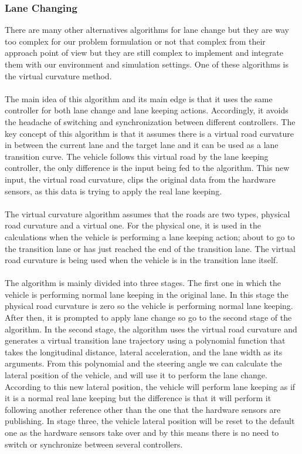 \subsubsection{Lane Changing}
\label{des_lane_change}
There are many other alternatives algorithms for lane change but they are way too complex for our problem formulation or not that complex from their approach point of view but they are still complex to implement and integrate them with our environment and simulation settings. One of these algorithms is the virtual curvature method\cite{doi:10.1002/atr.5670430104}.\\
\\
The main idea of this algorithm and its main edge is that it uses the same controller for both lane change and lane keeping actions. Accordingly, it avoids the headache of switching and synchronization between different controllers. The key concept of this algorithm is that it assumes there is a virtual road curvature in between the current lane and the target lane and it can be used as a lane transition curve. The vehicle follows this virtual road by the lane keeping controller, the only difference is the input being fed to the algorithm. This new input, the virtual road curvature, clips the original data from the hardware sensors, as this data is trying to apply the real lane keeping. \\
\\
The virtual curvature algorithm assumes that the roads are two types, physical road curvature and a virtual one. For the physical one, it is used in the calculations when the vehicle is performing a lane keeping action; about to go  to the transition lane or has just reached the end of the transition lane. The virtual road curvature is being used when the vehicle is in the transition lane itself. \\
\\
The algorithm is mainly divided into three stages. The first one in which the vehicle is performing normal lane keeping in the original lane. In this stage the physical road curvature is zero so the vehicle is performing normal lane keeping. After then, it is prompted to apply lane change so go to the second stage of the algorithm. In the second stage, the algorithm uses the virtual road curvature and generates a virtual transition lane trajectory using a polynomial function that takes the longitudinal distance, lateral acceleration, and the lane width as its arguments. From this polynomial  and the steering angle we can calculate the lateral position of the vehicle, and will use it to perform the lane change. According to this new lateral position, the vehicle will perform lane keeping as if it is a normal real lane keeping but the difference is that it will perform it following another reference other than the one that the hardware sensors are publishing. In stage three, the vehicle lateral position will be reset to the default one as the hardware sensors take over and by this means there is no need to switch or synchronize between several controllers. \\
